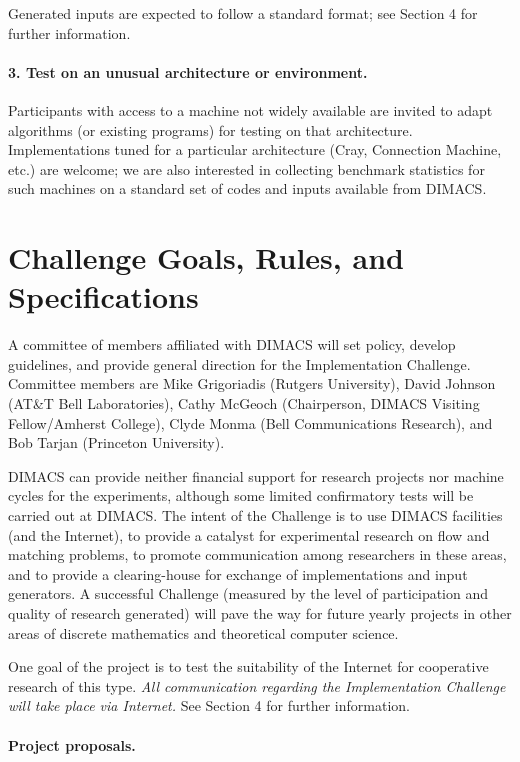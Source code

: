 Generated inputs are expected to follow a
standard format; see Section 4 for further information. 

\paragraph{3. Test on an unusual architecture or environment.}

Participants with access to a machine not widely available 
are invited to adapt algorithms (or existing programs) 
for testing on that architecture.  Implementations tuned for a particular
architecture (Cray, Connection Machine, etc.) are welcome; we are also
interested in collecting benchmark statistics for such machines 
on a standard set of codes and inputs available from DIMACS.  

\section{Challenge Goals, Rules, and Specifications} 

A committee of members affiliated with DIMACS will 
set policy, develop guidelines, and provide general direction
for the Implementation
Challenge.  Committee members are Mike Grigoriadis (Rutgers University), 
David Johnson (AT\&T Bell 
Laboratories), Cathy  McGeoch  (Chairperson, 
DIMACS Visiting Fellow/Amherst College), 
Clyde Monma (Bell Communications Research), and Bob Tarjan 
(Princeton University). 

DIMACS can provide neither financial support for research projects nor
machine cycles for the experiments, although some limited confirmatory 
tests will be carried out at DIMACS.   
The intent of the Challenge is to use DIMACS facilities (and the Internet), 
to provide a catalyst for experimental research on flow and matching 
problems, to promote communication among researchers in these areas, and to 
provide a clearing-house for exchange of implementations and
input generators.   A successful Challenge (measured by the level of 
participation and quality of research generated) will pave the way for 
future yearly projects in other areas of discrete
mathematics and theoretical computer science.  

One goal of the project is to test the suitability of the Internet
for cooperative research of this type.  
{\em All communication regarding the Implementation Challenge will take place
via Internet.}  See Section 4 for further information. 

\paragraph{Project proposals.} 


